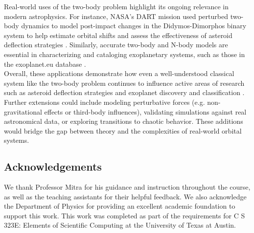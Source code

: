 \documentclass[linenumbers, twocolumn]{aastex631}
\begin{document}
\noindent Real-world uses of the two-body problem highlight its ongoing
relevance in modern astrophysics. For instance, NASA's DART mission used perturbed
two-body dynamics to model post-impact changes in the Didymos-Dimorphos binary
system to help estimate orbital shifts and assess the effectiveness of asteroid
deflection strategies \cite{meyer}. Similarly, accurate two-body and N-body
models are essential in characterizing and cataloging exoplanetary systems,
such as those in the exoplanet.eu database \cite{schneider}.\\

\noindent Overall, these applications demonstrate how even a well-understood
classical system like the two-body problem continues to influence active
areas of research such as asteroid deflection strategies and exoplanet
discovery and classification \cite{meyer}. Further extensions could include modeling
perturbative forces (e.g. non-gravitational effects or third-body influences),
validating simulations against real astronomical data, or exploring transitions
to chaotic behavior. These additions would bridge the gap between theory and
the complexities of real-world orbital systems.


\subsection*{Acknowledgements}
We thank Professor Mitra for his guidance and instruction throughout the course,
as well as the teaching assistants for their helpful feedback. We also
acknowledge the Department of Physics for providing an excellent academic foundation 
to support this work. This work was completed as part of the requirements for 
C S 323E: Elements of Scientific Computing at the University of Texas at Austin.

\newpage


\end{document}
